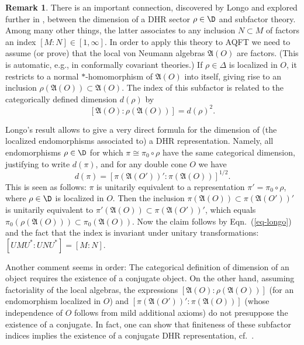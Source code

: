 \documentclass[12pt]{article}
\newcommand{\alg}[1]{\mathfrak{#1}}
\theoremstyle{definition}
\theoremstyle{definition}
\newtheorem{note}[thm]{Remark}
\theoremstyle{remark}
\begin{document}
\begin{note} \label{note-longo}
There is an important connection, discovered by Longo \cite{longo} and explored further in
\cite{LR},  between the dimension of a DHR sector $\rho\in\D$ and subfactor theory. Among many other
things, the latter associates  to any inclusion $N\subset M$ of factors an index
$[M:N]\in[1,\infty]$. In order to apply this theory to AQFT we need  to assume (or prove) that the
local von Neumann algebras $\alg{A}(O)$ are factors. (This is automatic, e.g., in conformally
covariant theories.) If $\rho\in\Delta$ is localized in $O$, it restricts to a normal
$*$-homomorphism  of $\alg{A}(O)$ into itself, giving rise to an inclusion
$\rho(\alg{A}(O))\subset\alg{A}(O)$. The index of this subfactor is related to the categorically
defined dimension $d(\rho)$ by  
\begin{equation}\label{eq-longo} [\alg{A}(O):\rho(\alg{A}(O))]=d(\rho)^2. \end{equation} 

Longo's result allows to give a very direct formula for the dimension of (the localized
endomorphisms associated to) a DHR representation. Namely, all endomorphisms $\rho\in\D$ for which
$\pi\cong\pi_0\circ\rho$ have the same categorical dimension, justifying to write $d(\pi)$, and for
any double cone $O$ we have 
\[ d(\pi)=[\pi(\alg{A}(O'))':\pi(\alg{A}(O))]^{1/2}. \]
This is seen as follows: $\pi$ is unitarily equivalent
to a representation $\pi'=\pi_0\circ\rho$, where
$\rho\in\D$ is localized in $O$. Then the inclusion
$\pi(\alg{A}(O))\subset\pi(\alg{A}(O'))'$ is unitarily
equivalent to
$\pi'(\alg{A}(O))\subset\pi(\alg{A}(O'))'$, which
equals
$\pi_0(\rho(\alg{A}(O)))\subset\pi_0(\alg{A}(O))$. Now
the claim follows by Eqn.\ (\ref{eq-longo}) and the
fact that the index is invariant under unitary
transformations: $[UMU^*:UNU^*]=[M:N]$.

Another comment seems in order: The categorical
definition of dimension of an object requires the
existence of a conjugate object. On the other hand,
assuming factoriality of the local algebras, the
expressions $[\alg{A}(O):\rho(\alg{A}(O))]$ (for an
endomorphism localized in $O$) and
$[\pi(\alg{A}(O'))':\pi(\alg{A}(O))]$ (whose
independence of $O$ follows from mild additional
axioms) do not presuppose the existence of a
conjugate. In fact, one can show that finiteness of
these subfactor indices implies the existence of a
conjugate DHR representation, cf.\ \cite{guido-longo}.
\end{note}
\end{document}
